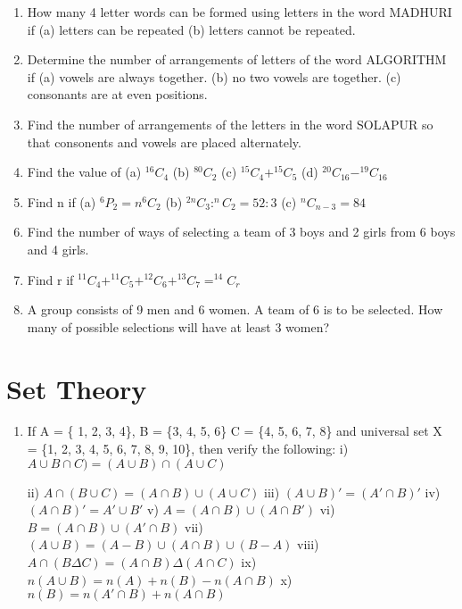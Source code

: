 \documentclass[14pt]{article}
\begin{document}
\begin{multicols}{2}
\begin{enumerate}
\item How many 4 letter words can be formed
using letters in the word MADHURI if
(a) letters can be repeated (b) letters cannot
be repeated.



\item Determine the number of arrangements of
letters of the word ALGORITHM if
(a) vowels are always together.
(b) no two vowels are together.
(c) consonants are at even positions.

\item Find the number of arrangements of the letters
in the word SOLAPUR so that consonents
and vowels are placed alternately.

\item Find the value of  (a) $ ^{16}C_4 $
(b)  $ ^{80}C_2$
(c)  $ ^{15}C_4 + ^{15}C_5 $
(d)  $ ^{20}C_{16} - ^{19}C_{16} $

\item Find n if  (a) $ ^6P_2 = n ^6C_2 $
(b)  $ ^{2n}C_3 : ^nC_2 = 52:3$
(c)  $ ^nC_{n-3}=84$

\item Find the number of ways of selecting a team
of 3 boys and 2 girls from 6 boys and 4 girls.

\item Find r if  $ ^{11}C_4 + ^{11}C_5 + ^{12}C_6 +  ^{13}C_7=^{14}C_r$
 
 \item A group consists of 9 men and 6 women.
A team of 6 is to be selected. How many
of possible selections will have at least
3 women?
\end{enumerate} 


\section{Set Theory}
\noindent
\begin{enumerate}[resume]

\item  If A = \{ 1, 2, 3, 4\}, B = \{3, 4, 5, 6\}
		  C = \{4, 5, 6, 7, 8\} and universal set  X = \{1, 2, 3, 4, 5, 6, 7, 8, 9, 10\}, then verify
the following:
i)		$ A \cup B\cap C) = (A\cup B) \cap (A \cup C)$

ii)	$A\cap (B\cup C)=(A\cap B)\cup (A \cup C)$
iii) $(A\cup B)' = (A'\cap B)'         $
iv)	$ (A\cap B)' = A'\cup B'          $
v)	$	 A = (A\cap B)\cup (A\cap B') $
vi)	$	 B = (A\cap B)\cup (A'\cap B) $
vii) $(A\cup B)=(A-B)\cup (A\cap B)\cup (B-A)$
viii)	$A \cap (B\Delta C) = (A\cap B) \Delta (A\cap C)$
ix) $n (A\cup B) = n(A) + n(B) - n(A\cap B)$ 
x) $n (B) = n(A'\cap B) + n(A\cap B)$


\end{enumerate}
\end{multicols}
\end{document}
